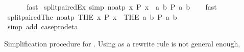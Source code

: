 \begin{isabellebody}
\ \ %
\isanewline
%
\isadelimproof
\ \ %
\endisadelimproof
%
\isatagproof
{}\isamarkupfalse%
\ fast%
\endisatagproof
{\isafoldproof}%
%
\isadelimproof
\isanewline
%
\endisadelimproof
\isanewline
{}\isamarkupfalse%
\ split{\isacharunderscore}{\kern0pt}paired{\isacharunderscore}{\kern0pt}Ex\ {\isacharbrackleft}{\kern0pt}simp{\isacharcomma}{\kern0pt}\ no{\isacharunderscore}{\kern0pt}atp{\isacharbrackright}{\kern0pt}{\isacharcolon}{\kern0pt}\ {\isachardoublequoteopen}{\isacharparenleft}{\kern0pt}{\isasymexists}x{\isachardot}{\kern0pt}\ P\ x{\isacharparenright}{\kern0pt}\ {\isasymlongleftrightarrow}\ {\isacharparenleft}{\kern0pt}{\isasymexists}a\ b{\isachardot}{\kern0pt}\ P\ {\isacharparenleft}{\kern0pt}a{\isacharcomma}{\kern0pt}\ b{\isacharparenright}{\kern0pt}{\isacharparenright}{\kern0pt}{\isachardoublequoteclose}\isanewline
%
\isadelimproof
\ \ %
\endisadelimproof
%
\isatagproof
{}\isamarkupfalse%
\ fast%
\endisatagproof
{\isafoldproof}%
%
\isadelimproof
\isanewline
%
\endisadelimproof
\isanewline
{}\isamarkupfalse%
\ split{\isacharunderscore}{\kern0pt}paired{\isacharunderscore}{\kern0pt}The\ {\isacharbrackleft}{\kern0pt}no{\isacharunderscore}{\kern0pt}atp{\isacharbrackright}{\kern0pt}{\isacharcolon}{\kern0pt}\ {\isachardoublequoteopen}{\isacharparenleft}{\kern0pt}THE\ x{\isachardot}{\kern0pt}\ P\ x{\isacharparenright}{\kern0pt}\ {\isacharequal}{\kern0pt}\ {\isacharparenleft}{\kern0pt}THE\ {\isacharparenleft}{\kern0pt}a{\isacharcomma}{\kern0pt}\ b{\isacharparenright}{\kern0pt}{\isachardot}{\kern0pt}\ P\ {\isacharparenleft}{\kern0pt}a{\isacharcomma}{\kern0pt}\ b{\isacharparenright}{\kern0pt}{\isacharparenright}{\kern0pt}{\isachardoublequoteclose}\isanewline
\ \ %
\isanewline
%
\isadelimproof
\ \ %
\endisadelimproof
%
\isatagproof
{}\isamarkupfalse%
\ {\isacharparenleft}{\kern0pt}simp\ add{\isacharcolon}{\kern0pt}\ case{\isacharunderscore}{\kern0pt}prod{\isacharunderscore}{\kern0pt}eta{\isacharparenright}{\kern0pt}%
\endisatagproof
{\isafoldproof}%
%
\isadelimproof
%
\endisadelimproof
%
\begin{isamarkuptext}%
Simplification procedure for .  Using
   as a rewrite rule is not general enough,

\end{isamarkuptext}
\end{isabellebody}
